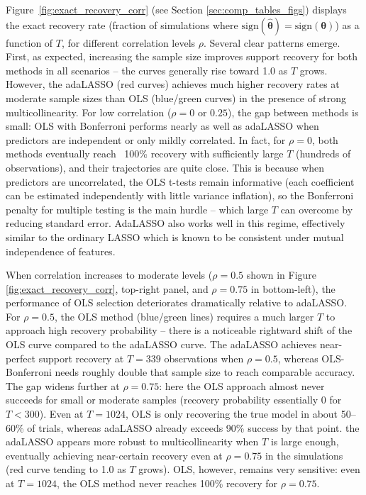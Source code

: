 \documentclass[10pt,a4paper,oneside]{article}
\begin{document}
Figure~\ref{fig:exact_recovery_corr} (see Section \ref{sec:comp_tables_figs}) displays the exact recovery rate (fraction of simulations where $\mathrm{sign}(\hat{\boldsymbol{\theta}}) = \mathrm{sign}(\boldsymbol{\theta})$) as a function of $T$, for different correlation levels $\rho$. Several clear patterns emerge. First, as expected, increasing the sample size improves support recovery for both methods in all scenarios – the curves generally rise toward 1.0 as $T$ grows. However, the adaLASSO (red curves) achieves much higher recovery rates at moderate sample sizes than OLS (blue/green curves) in the presence of strong multicollinearity. For low correlation ($\rho=0$ or $0.25$), the gap between methods is small: OLS with Bonferroni performs nearly as well as adaLASSO when predictors are independent or only mildly correlated. In fact, for $\rho=0$, both methods eventually reach ~100\% recovery with sufficiently large $T$ (hundreds of observations), and their trajectories are quite close. This is because when predictors are uncorrelated, the OLS t-tests remain informative (each coefficient can be estimated independently with little variance inflation), so the Bonferroni penalty for multiple testing is the main hurdle – which large $T$ can overcome by reducing standard error. AdaLASSO also works well in this regime, effectively similar to the ordinary LASSO which is known to be consistent under mutual independence of features.

When correlation increases to moderate levels ($\rho=0.5$ shown in Figure \ref{fig:exact_recovery_corr}, top-right panel, and $\rho=0.75$ in bottom-left), the performance of OLS selection deteriorates dramatically relative to adaLASSO. For $\rho=0.5$, the OLS method (blue/green lines) requires a much larger $T$ to approach high recovery probability – there is a noticeable rightward shift of the OLS curve compared to the adaLASSO curve. The adaLASSO achieves near-perfect support recovery at $T = 339$ observations when $\rho=0.5$, whereas OLS-Bonferroni needs roughly double that sample size to reach comparable accuracy. The gap widens further at $\rho=0.75$: here the OLS approach almost never succeeds for small or moderate samples (recovery probability essentially 0 for $T < 300$). Even at $T = 1024$, OLS is only recovering the true model in about 50–60\% of trials, whereas adaLASSO already exceeds 90\% success by that point.  the adaLASSO appears more robust to multicollinearity when $T$ is large enough, eventually achieving near-certain recovery even at $\rho=0.75$ in the simulations (red curve tending to 1.0 as $T$ grows). OLS, however, remains very sensitive: even at $T=1024$, the OLS method never reaches 100\% recovery for $\rho=0.75$.
\end{document}
